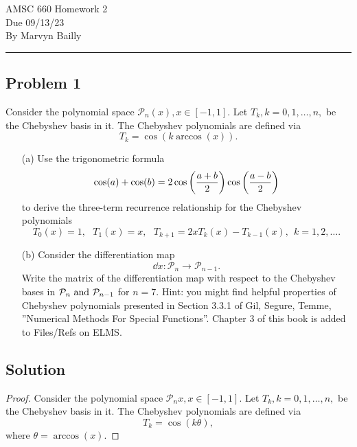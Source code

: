 \documentclass[12pt]{report}
\begin{document}
\large
\begin{center}
AMSC 660 Homework 2\\
Due 09/13/23\\
By Marvyn Bailly\\
\end{center}
\normalsize
\hrule






\begin{problem}%
\subsection*{Problem 1}

Consider the polynomial space $\mathcal{P}_n(x),x\in[-1,1]$. Let $T_k, k =0,1,\dots,n,$ be the Chebyshev basis in it. The Chebyshev polynomials are defined via
\[
    T_k = \cos(k \arccos(x)).
\]
\begin{enumerate}
    \item [(a)] Use the trigonometric formula
    \[
        \cos(a) + \cos(b) = 2 \cos {\left(\frac{a+b}{2}\right)}\cos{\left(\frac{a-b}{2}\right)}
    \]
    to derive the three-term recurrence relationship for the Chebyshev polynomials
    \[
        T_0(x) = 1, ~~~ T_1(x) = x, ~~~ T_{k+1} = 2x T_k(x) - T_{k-1}(x), ~~ k=1,2,\dots.
    \]


    \item [(b)] Consider the differentiation map
    \[
        \dd{}{x}: \mathcal{P}_n \to \mathcal{P}_{n-1}.
    \]
    Write the matrix of the differentiation map with respect to the Chebyshev bases in $\mathcal{P}_n {~\text{and}~} \mathcal{P}_{n-1}$ for $n = 7$. Hint: you might ﬁnd helpful properties of Chebyshev polynomials presented in Section 3.3.1 of Gil, Segure, Temme, ”Numerical
    Methods For Special Functions”. Chapter 3 of this book is added to Files/Refs
    on ELMS.


\end{enumerate}


\subsection*{Solution}
\begin{proof}

Consider the polynomial space $\mathcal{P}_n{x},x\in[-1,1]$. Let $T_k, k =0,1,\dots,n,$ be the Chebyshev basis in it. The Chebyshev polynomials are defined via
\[
    T_k = \cos(k \theta),
\]
where $\theta = \arccos(x)$.


\end{proof}
\end{problem}
\end{document}
